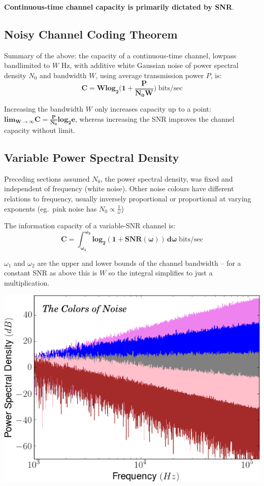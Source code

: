 \documentclass[a4paper, 11pt]{article}
\begin{document}
{{        \textbf{Continuous-time channel capacity is primarily dictated by SNR}.
    }
    \subsection*{Noisy Channel Coding Theorem}
    {
        Summary of the above: the capacity of a continuous-time channel, lowpass bandlimited to \(W\) Hz, with additive white Gaussian noise of power spectral density \(N_0\) and bandwidth \(W\), using average transmission power \(P\), is:
        \[\bm{C = W\textbf{log}_2\Bigg(1 + \frac{P}{N_0 W}\Bigg)}\;\text{bits/sec}\]

        Increasing the bandwidth \(W\) only increases capacity up to a point: \(\displaystyle \bm{\textbf{lim}_{W \rightarrow \infty}{C} = \frac{P}{N_0}\textbf{log}_2{e}}\), whereas increasing the SNR improves the channel capacity without limit.
    }
    \subsection*{Variable Power Spectral Density}
    {
        \begin{minipage}[t]{0.6\textwidth}
        \setlength{\parskip}{8pt}
        Preceding sections assumed \(N_0\), the power spectral density, was fixed and independent of frequency (white noise). Other noise colours have different relations to frequency, usually inversely proportional or proportional at varying exponents (eg.\ pink noise has \(\displaystyle N_0 \propto \frac{1}{\omega}\))

        The information capacity of a variable-SNR channel is:
        \[\bm{C = \int_{\omega_1}^{\omega_2}{\textbf{log}_2(1 + \textbf{SNR}(\omega))\, d\omega}}\;\text{bits/sec}\]

        \(\omega_1\) and \(\omega_2\) are the upper and lower bounds of the channel bandwidth -- for a constant SNR as above this is \(W\) so the integral simplifies to just a multiplication.
        \end{minipage}
        \hspace{3mm}
        \begin{minipage}[t]{0.35\textwidth}
        \vspace{-2mm}
        \centering
        \includegraphics[width=\textwidth]{colours.png}
        \end{minipage}
    }
}
\end{document}
